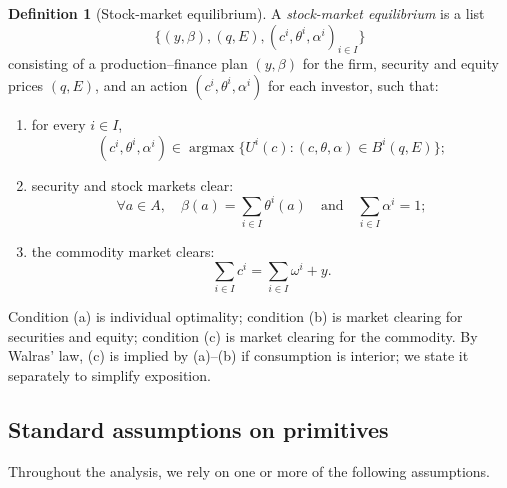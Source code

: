 \documentclass[11pt,a4paper,oneside]{book}
\def\et{\quad \text{and} \quad}
\DeclareMathOperator*{\argmax}{argmax}
\theoremstyle{plain}
\theoremstyle{definition}
\newtheorem{definition}[theorem]{Definition}
\theoremstyle{remark}
\numberwithin{equation}{chapter}
\begin{document}
\begin{definition}[Stock-market equilibrium]\label{def:equilibrium}
A \emph{stock-market equilibrium} is a list
\begin{equation*}
  \bigl\{ (y, \beta), (q, E), (c^i, \theta^i, \alpha^i)_{i \in I} \bigr\}
\end{equation*}
consisting of a production--finance plan $(y, \beta)$ for the firm, security and equity prices $(q, E)$, and an action $(c^i, \theta^i, \alpha^i)$ for each investor, such that:
\begin{enumerate}
  \item[(a)] for every $i \in I$,
  \begin{equation*}
    (c^i, \theta^i, \alpha^i) \in \argmax \bigl\{ U^i(c) \colon (c, \theta, \alpha) \in B^i(q, E) \bigr\};
  \end{equation*}
  \item[(b)] security and stock markets clear:
  \begin{equation*}
    \forall a \in A, \quad \beta(a) = \sum_{i \in I} \theta^i(a)
    \et
    \sum_{i \in I} \alpha^i = 1;
  \end{equation*}
  \item[(c)] the commodity market clears:
  \begin{equation*}
    \sum_{i \in I} c^i = \sum_{i \in I} \omega^i + y.
  \end{equation*}
\end{enumerate}
\end{definition}

Condition (a) is individual optimality; condition (b) is market clearing for securities and equity; condition (c) is market clearing for the commodity.
By Walras' law, (c) is implied by (a)--(b) if consumption is interior; we state it separately to simplify exposition.

\subsection{Standard assumptions on primitives}

Throughout the analysis, we rely on one or more of the following assumptions.
\end{document}
